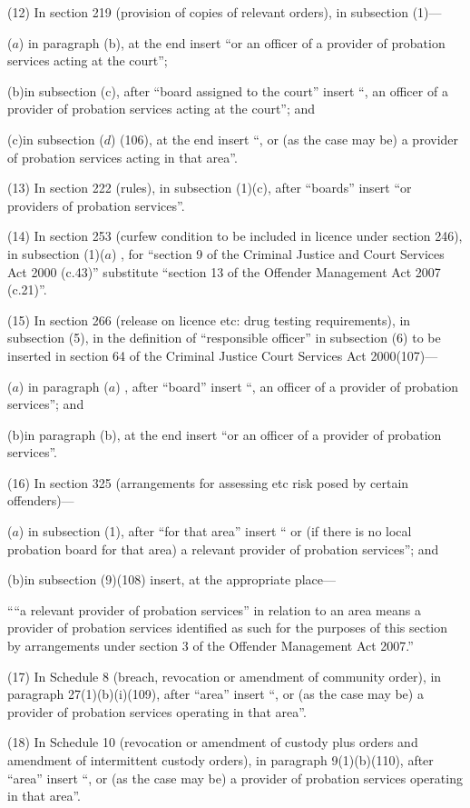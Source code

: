 \documentclass[12pt,a4paper]{article}
\begin{document}
(12) In section 219 (provision of copies of relevant orders), in subsection (1)—

($a$) in paragraph (b), at the end insert “or an officer of a provider of probation services acting at the court”;

(b)in subsection (c), after “board assigned to the court” insert “, an officer of a provider of probation services acting at the court”; and

(c)in subsection ($d$) (106), at the end insert “, or (as the case may be) a provider of probation services acting in that area”.

(13) In section 222 (rules), in subsection (1)(c), after “boards” insert “or providers of probation services”.

(14) In section 253 (curfew condition to be included in licence under section 246), in subsection (1)($a$) , for “section 9 of the Criminal Justice and Court Services Act 2000 (c.43)” substitute “section 13 of the Offender Management Act 2007 (c.21)”.

(15) In section 266 (release on licence etc: drug testing requirements), in subsection (5), in the definition of “responsible officer” in subsection (6) to be inserted in section 64 of the Criminal Justice Court Services Act 2000(107)—

($a$) in paragraph ($a$) , after “board” insert “, an officer of a provider of probation services”; and

(b)in paragraph (b), at the end insert “or an officer of a provider of probation services”.

(16) In section 325 (arrangements for assessing etc risk posed by certain offenders)—

($a$) in subsection (1), after “for that area” insert “ or (if there is no local probation board for that area) a relevant provider of probation services”; and

(b)in subsection (9)(108) insert, at the appropriate place—

““a relevant provider of probation services” in relation to an area means a provider of probation services identified as such for the purposes of this section by arrangements under section 3 of the Offender Management Act 2007.”

(17) In Schedule 8 (breach, revocation or amendment of community order), in paragraph 27(1)(b)(i)(109), after “area” insert “, or (as the case may be) a provider of probation services operating in that area”.

(18) In Schedule 10 (revocation or amendment of custody plus orders and amendment of intermittent custody orders), in paragraph 9(1)(b)(110), after “area” insert “, or (as the case may be) a provider of probation services operating in that area”.
\end{document}
